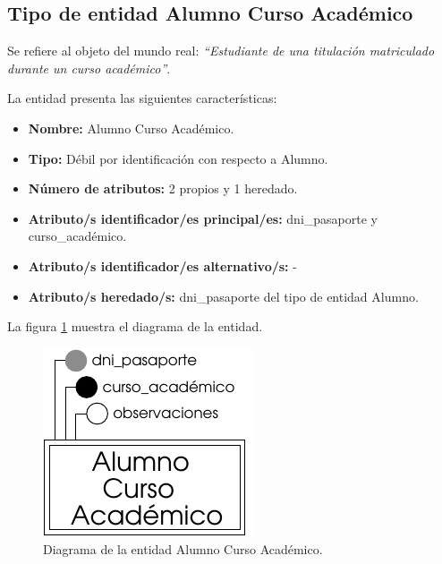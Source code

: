 \subsection{Tipo de entidad Alumno Curso Académico}

   \begin{description}

   \item[Definición] Se refiere al objeto del mundo real: \emph{``Estudiante de
   una titulación matriculado durante un curso académico''}.

   \item[Características] La entidad presenta las siguientes características:
      \begin{itemize}
         \item \textbf{Nombre:} Alumno Curso Académico.
         \item \textbf{Tipo:} Débil por identificación con respecto a Alumno.
         \item \textbf{Número de atributos:} 2 propios y 1 heredado.
         \item \textbf{Atributo/s identificador/es principal/es:} dni\_pasaporte y \\curso\_académico.
         \item \textbf{Atributo/s identificador/es alternativo/s:} -
         \item \textbf{Atributo/s heredado/s:} dni\_pasaporte del tipo
         de entidad Alumno.
      \end{itemize}

   \item[Diagrama] La figura \ref{diagramaAlumnoCA} muestra el diagrama de la entidad.
   \item \begin{figure}[!ht]
            \begin{center}
            \includegraphics[]{07.Modelo_Entidad-Interrelacion/7.2.Analisis_Entidades/diagramas/alumnoca.pdf}
            \caption{Diagrama de la entidad Alumno Curso Académico.}
            \label{diagramaAlumnoCA}
            \end{center}
         \end{figure}


\end{description}
